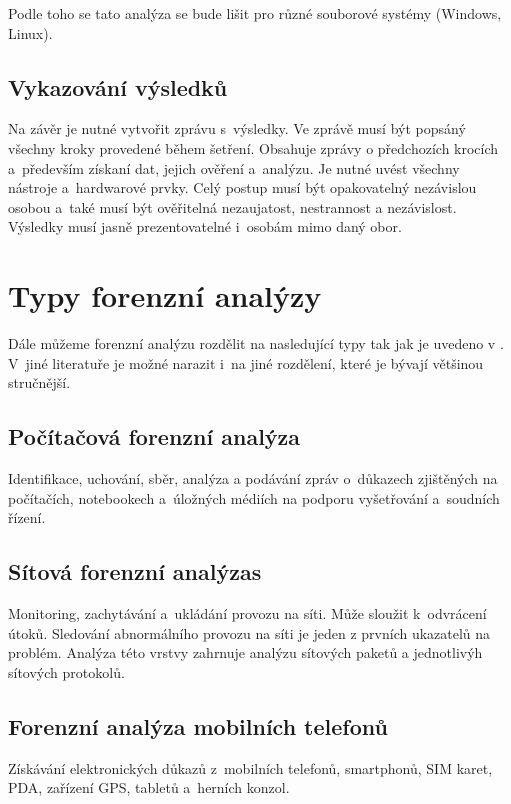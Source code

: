 \documentclass[thesis=B,czech]{FITthesis}[2012/06/26]
\begin{document}
\cite{for_root} Podle toho se tato analýza se bude lišit pro různé souborové systémy (Windows, Linux).

\subsection{Vykazování výsledků}
Na závěr je nutné vytvořit zprávu s~výsledky. Ve zprávě musí být popsáný všechny kroky provedené během šetření. Obsahuje zprávy o předchozích krocích a~především získaní dat, jejich ověření a~analýzu. Je nutné uvést všechny nástroje a~hardwarové prvky. Celý postup musí být opakovatelný nezávislou osobou a~také musí být ověřitelná nezaujatost, nestrannost a nezávislost. Výsledky musí jasně prezentovatelné i~osobám mimo daný obor.





\section{Typy forenzní analýzy}
Dále můžeme forenzní analýzu rozdělit na nasledující typy tak jak je uvedeno v \cite{for_types}. V~jiné literatuře je možné narazit i~na jiné rozdělení, které je bývají většinou stručnější.

\subsection{Počítačová forenzní analýza}
Identifikace, uchování, sběr, analýza a podávání zpráv o~důkazech zjištěných na počítačích, notebookech a~úložných médiích na podporu vyšetřování a~soudních řízení.

\subsection{Sítová forenzní analýzas}
Monitoring, zachytávání a~ukládání provozu na síti. Může sloužit k~odvrácení útoků. Sledování abnormálního provozu na síti je jeden z prvních ukazatelů na problém. Analýza této vrstvy zahrnuje analýzu sítových paketů a jednotlivýh sítových protokolů\cite{carrier2003defining}.

\subsection{Forenzní analýza  mobilních telefonů}
Získávání elektronických důkazů z~mobilních telefonů, smartphonů, SIM karet, PDA, zařízení GPS, tabletů a~herních konzol.
\end{document}

